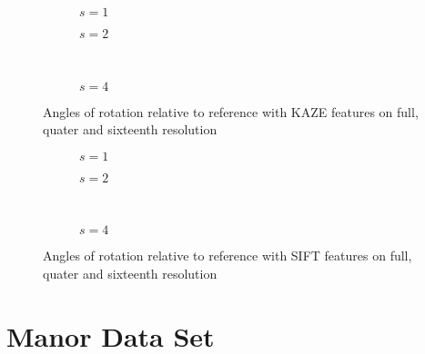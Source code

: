 \begin{figure}
   \begin{subfigure}{.5\linewidth}
      \centering      
      
      \label{fig:train_KAZE_rotation_1}
      \caption{$s=1$}
   \end{subfigure}
   \quad
   \begin{subfigure}{.5\linewidth}
      \centering      
      
      \label{fig:train_KAZE_rotation_2}
      \caption{$s=2$}
   \end{subfigure}\\[3ex]
   \begin{subfigure}{\linewidth}
      \centering      
      
      \label{fig:train_KAZE_rotation_4}
      \caption{$s=4$}
   \end{subfigure}

   \caption{Angles of rotation relative to reference with
   KAZE features on full, quater and sixteenth resolution}
\end{figure}

\begin{figure}
   \begin{subfigure}{.5\linewidth}
      \centering      
      
      \label{fig:train_SIFT_rotation_1}
      \caption{$s=1$}
   \end{subfigure}
   \quad
   \begin{subfigure}{.5\linewidth}
      \centering      
      
      \label{fig:train_SIFT_rotation_2}
      \caption{$s=2$}
   \end{subfigure}\\[3ex]
   \begin{subfigure}{\linewidth}
      \centering      
      
      \label{fig:train_SIFT_rotation_4}
      \caption{$s=4$}
   \end{subfigure}

   \caption{Angles of rotation relative to reference with
   SIFT features on full, quater and sixteenth resolution}
\end{figure}

\FloatBarrier

\section{Manor Data Set}

